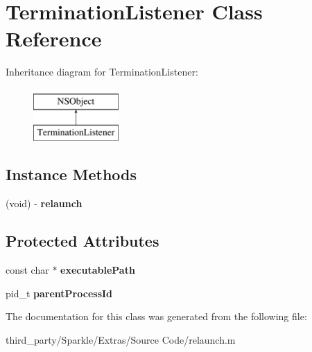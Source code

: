 \hypertarget{interface_termination_listener}{}\section{Termination\+Listener Class Reference}
\label{interface_termination_listener}
Inheritance diagram for Termination\+Listener\+:\begin{figure}[H]
\begin{center}
\leavevmode
\includegraphics[height=2.000000cm]{interface_termination_listener}
\end{center}
\end{figure}
\subsection*{Instance Methods}
\begin{DoxyCompactItemize}
\item 
\mbox{\label{interface_termination_listener_a40a4c0c31a44eb8ae2fa00feb67ef969}} 
(void) -\/ {\bfseries relaunch}
\end{DoxyCompactItemize}
\subsection*{Protected Attributes}
\begin{DoxyCompactItemize}
\item 
\mbox{\label{interface_termination_listener_ae81f11bbf488e8ec4261d9a9c1934110}} 
const char $\ast$ {\bfseries executable\+Path}
\item 
\mbox{\label{interface_termination_listener_a06214a376549ae3abb3de0d457e0fa24}} 
pid\+\_\+t {\bfseries parent\+Process\+Id}
\end{DoxyCompactItemize}


The documentation for this class was generated from the following file\+:\begin{DoxyCompactItemize}
\item 
third\+\_\+party/\+Sparkle/\+Extras/\+Source Code/relaunch.\+m\end{DoxyCompactItemize}
